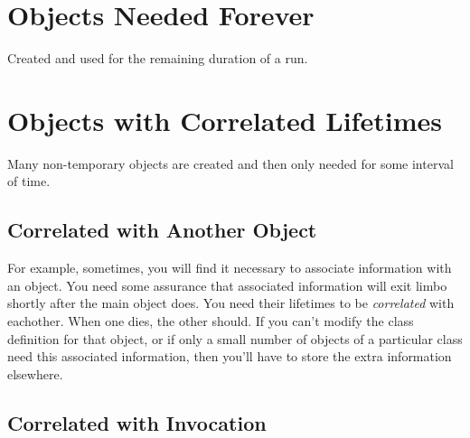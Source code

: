 



\section{Objects Needed Forever}
\label{forever-lifetime}

Created and used for the remaining duration of a run.


\section{Objects with Correlated Lifetimes}

Many non-temporary objects are created and then only needed for some interval of
time.

\subsection{Correlated with Another Object}
\label{correlated-lifetime-1}


For example, sometimes, you will find it necessary to associate information with
an object. You need some assurance that associated information will exit limbo
shortly after the main object does. You need their lifetimes to be {\em
correlated} with eachother. When one dies, the other should. If you can't modify
the class definition for that object, or if only a small number of objects of a
particular class need this associated information, then you'll have to store the
extra information elsewhere.

\subsection{Correlated with Invocation}
\label{correlated-lifetime-2}

